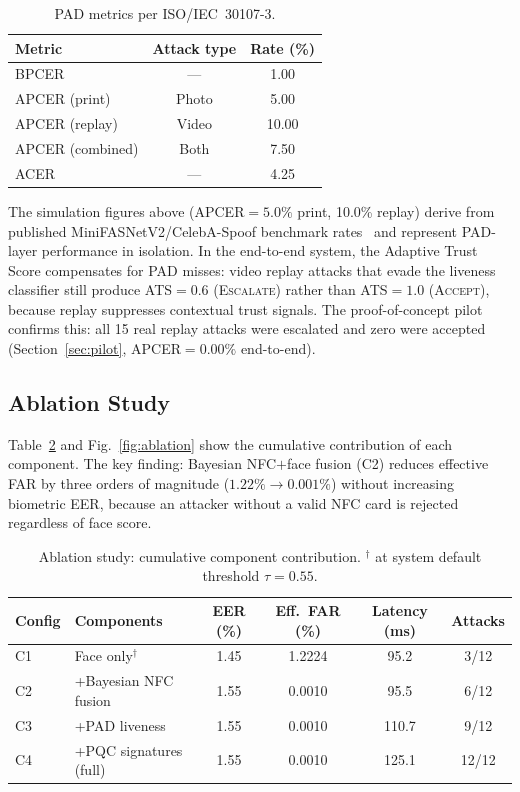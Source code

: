 \documentclass[conference]{IEEEtran}
\begin{document}
\begin{table}[t]
\centering
\caption{PAD metrics per ISO/IEC~30107-3.}
\label{tab:pad}
\begin{tabular}{lcc}
  \toprule
  Metric & Attack type & Rate (\%) \\
  \midrule
  BPCER & —     & 1.00 \\
  APCER (print)  & Photo & 5.00 \\
  APCER (replay) & Video & 10.00 \\
  APCER (combined) & Both & 7.50 \\
  ACER & —     & 4.25 \\
  \bottomrule
\end{tabular}
\end{table}

The simulation figures above (APCER\(=5.0\%\) print, 10.0\% replay)
derive from published MiniFASNetV2/CelebA-Spoof benchmark
rates~\cite{zhang2020minifasnet} and represent PAD-layer performance
in isolation. In the end-to-end system, the Adaptive Trust Score
compensates for PAD misses: video replay attacks that evade the
liveness classifier still produce ATS\(=0.6\) (\textsc{Escalate})
rather than ATS\(=1.0\) (\textsc{Accept}), because replay suppresses
contextual trust signals. The proof-of-concept pilot confirms this:
all 15 real replay attacks were escalated and zero were accepted
(Section~\ref{sec:pilot}, APCER\(=0.00\%\) end-to-end).

\subsection{Ablation Study}
\label{sec:ablation}

Table~\ref{tab:ablation} and Fig.~\ref{fig:ablation} show the cumulative
contribution of each component. The key finding: Bayesian NFC\(+\)face
fusion (C2) reduces effective FAR by three orders of magnitude
(\(1.22\% \to 0.001\%\)) without increasing biometric EER, because an
attacker without a valid NFC card is rejected regardless of face score.

\begin{table}[t]
\centering
\caption{Ablation study: cumulative component contribution.
  \(^\dagger\) at system default threshold \(\tau{=}0.55\).}
\label{tab:ablation}
\begin{tabular}{llcccc}
  \toprule
  Config & Components & EER (\%) & Eff.\ FAR (\%) & Latency (ms) & Attacks \\
  \midrule
  C1 & Face only\(^\dagger\)     & 1.45 & 1.2224 & 95.2  & 3/12 \\
  C2 & +Bayesian NFC fusion      & 1.55 & 0.0010 & 95.5  & 6/12 \\
  C3 & +PAD liveness             & 1.55 & 0.0010 & 110.7 & 9/12 \\
  C4 & +PQC signatures (full)    & 1.55 & 0.0010 & 125.1 & 12/12 \\
  \bottomrule
\end{tabular}
\end{table}
\end{document}
